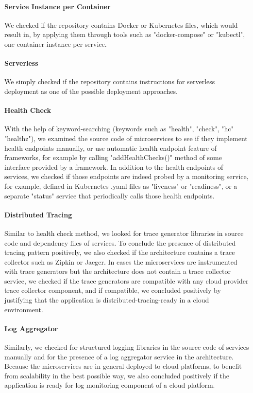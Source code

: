 \documentclass{Configuration_Files/PoliMi3i_thesis}
\begin{document}
\paragraph{Service Instance per Container} We checked if the repository contains Docker or Kubernetes files, which would result in, by applying them through tools such as "docker-compose" or "kubectl", one container instance per service.

\paragraph{Serverless} We simply checked if the repository contains instructions for serverless deployment as one of the possible deployment approaches.

\paragraph{Health Check} With the help of keyword-searching (keywords such as "health", "check", "hc" "healthz"), we examined the source code of microservices to see if they implement health endpoints manually, or use automatic health endpoint feature of frameworks, for example by calling "addHealthChecks()" method of some interface provided by a framework.
In addition to the health endpoints of services, we checked if those endpoints are indeed probed by a monitoring service, for example, defined in Kubernetes .yaml files as "liveness" or "readiness", or a separate "status" service that periodically calls those health endpoints.

\paragraph{Distributed Tracing} Similar to health check method, we looked for trace generator libraries in source code and dependency files of services.
To conclude the presence of distributed tracing pattern positively, we also checked if the architecture contains a trace collector such as Zipkin or Jaeger.
In cases the microservices are instrumented with trace generators but the architecture does not contain a trace collector service, we checked if the trace generators are compatible with any cloud provider trace collector component, and if compatible, we concluded positively by justifying that the application is distributed-tracing-ready in a cloud environment.

\paragraph{Log Aggregator} Similarly, we checked for structured logging libraries in the source code of services manually and for the presence of a log aggregator service in the architecture.
Because the microservices are in general deployed to cloud platforms, to benefit from scalability in the best possible way, we also concluded positively if the application is ready for log monitoring component of a cloud platform.
\end{document}
